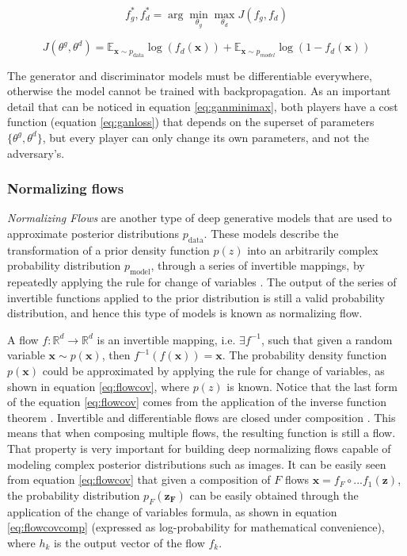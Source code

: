\begin{equation}
	\label{eq:ganminimax}
	f_g^*, f_d^* = \arg \min_{\theta_g} \max_{\theta_d} J(f_g, f_d)
\end{equation}

\begin{equation}
	\label{eq:ganloss}
	J(\theta^g, \theta^d) = \mathbb{E}_{\mathbf{x}\sim p_\mathrm{data}} \log (f_d(\mathbf{x})) + \mathbb{E}_{\mathbf{x}\sim p_{model}} \log (1 - f_d(\mathbf{x}))
\end{equation}

The generator and discriminator models must be differentiable everywhere, otherwise the model cannot be trained with backpropagation. As an important detail that can be noticed in equation \ref{eq:ganminimax}, both players have a cost function (equation \ref{eq:ganloss}) that depends on the superset  of parameters $\{\theta^g, \theta^d\}$, but every player can only change its own parameters, and not the adversary's.



\subsubsection{Normalizing flows}
\textit{Normalizing Flows} are another type of deep generative models that are used to approximate posterior distributions $p_\mathrm{data}$. These models describe the transformation of a prior density function $p(z)$ into an arbitrarily complex probability distribution $p_\mathrm{model}$, through a series of invertible mappings, by repeatedly applying the rule for change of variables \autocite{rezende2015}. The output of the series of invertible functions applied to the prior distribution is still a valid probability distribution, and hence this type of models is known as normalizing flow.

A flow $f: \mathbb{R}^d \rightarrow \mathbb{R}^d$ is an invertible mapping, i.e. $\exists f^{-1}$, such that given a random variable $\mathbf{x} \sim p(\mathbf{x})$, then $f^{-1}(f(\mathbf{x})) = \mathbf{x}$. The probability density function $p(\mathbf{x})$ could be approximated by applying the rule for change of variables, as shown in equation \ref{eq:flowcov}, where $p(z)$ is known. Notice that the last form of the  equation \ref{eq:flowcov} comes from the application of the inverse function theorem \autocite{rezende2015}.
Invertible and differentiable flows are closed under composition \autocite{kobyzev}. This means that when composing multiple flows, the resulting function is still a flow. That property is very important for building deep normalizing flows capable of modeling complex posterior distributions such as images. It can be easily seen from equation \ref{eq:flowcov}  \autocite{rezende2015} that given a composition of $F$ flows $\mathbf{x}=f_F \circ ... f_1(\mathbf{z})$, the probability distribution $p_F(\mathbf{z_F})$ can be easily obtained through the application of the change of variables formula, as shown in equation \ref{eq:flowcovcomp} (expressed as log-probability for mathematical convenience), where $h_k$ is the output vector of the flow $f_k$.


